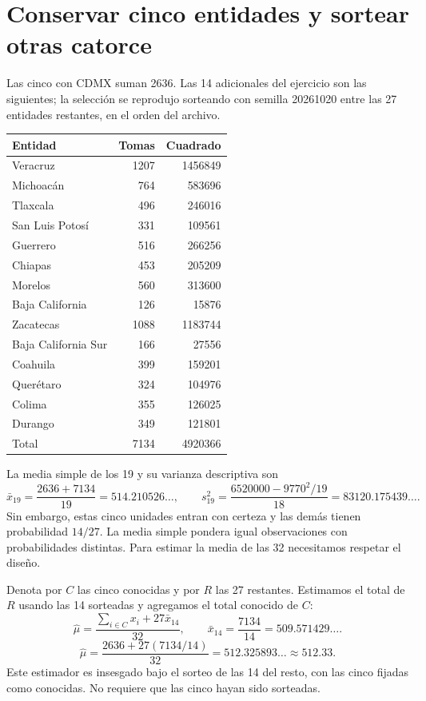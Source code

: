 \documentclass[11pt,letterpaper]{article}
\begin{document}
\section{Conservar cinco entidades y sortear otras catorce}
Las cinco con CDMX suman 2636. Las 14 adicionales del ejercicio son las siguientes; la selección se reprodujo sorteando con semilla 20261020 entre las 27 entidades restantes, en el orden del archivo.
\begin{longtable}{p{}rr}
\toprule\rowcolor{cabecera} Entidad & Tomas & Cuadrado \\ \midrule
Veracruz & 1207 & 1456849 \\
Michoacán & 764 & 583696 \\
Tlaxcala & 496 & 246016 \\
San Luis Potosí & 331 & 109561 \\
Guerrero & 516 & 266256 \\
Chiapas & 453 & 205209 \\
Morelos & 560 & 313600 \\
Baja California & 126 & 15876 \\
Zacatecas & 1088 & 1183744 \\
Baja California Sur & 166 & 27556 \\
Coahuila & 399 & 159201 \\
Querétaro & 324 & 104976 \\
Colima & 355 & 126025 \\
Durango & 349 & 121801 \\
\midrule Total & 7134 & 4920366 \\ \bottomrule
\end{longtable}
La media simple de los 19 y su varianza descriptiva son
\[
\bar{x}_{19}=\frac{2636+7134}{19}=514.210526\ldots,
\qquad s_{19}^2=\frac{6520000-9770^2/19}{18}=83120.175439\ldots.
\]
Sin embargo, estas cinco unidades entran con certeza y las demás tienen probabilidad $14/27$. La media simple pondera igual observaciones con probabilidades distintas. Para estimar la media de las 32 necesitamos respetar el diseño.

Denota por $C$ las cinco conocidas y por $R$ las 27 restantes. Estimamos el total de $R$ usando las 14 sorteadas y agregamos el total conocido de $C$:
\[
\widehat\mu=\frac{\sum_{i\in C}x_i+27\bar{x}_{14}}{32},\qquad
\bar{x}_{14}=\frac{7134}{14}=509.571429\ldots.
\]
\[
\widehat\mu=\frac{2636+27(7134/14)}{32}=512.325893\ldots\approx512.33.
\]
Este estimador es insesgado bajo el sorteo de las 14 del resto, con las cinco fijadas como conocidas. No requiere que las cinco hayan sido sorteadas.
\clearpage
\end{document}
